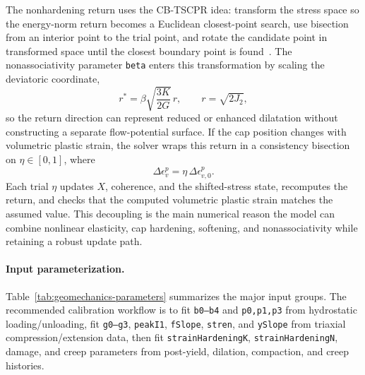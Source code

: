 The nonhardening return uses the CB-TSCPR idea: transform the stress space so the energy-norm return becomes a Euclidean closest-point search, use bisection from an interior point to the trial point, and rotate the candidate point in transformed space until the closest boundary point is found~\cite{homel2015cbtscpr}.  The nonassociativity parameter \texttt{beta} enters this transformation by scaling the deviatoric coordinate,
\begin{equation}
  r^* = \beta\sqrt{\frac{3K}{2G}}\,r,
  \qquad r=\sqrt{2J_2},
  \label{eq:geomechanics-transformed-space}
\end{equation}
so the return direction can represent reduced or enhanced dilatation without constructing a separate flow-potential surface.  If the cap position changes with volumetric plastic strain, the solver wraps this return in a consistency bisection on \(\eta\in[0,1]\), where
\begin{equation}
  \Delta\epsilon_v^p = \eta\,\Delta\epsilon_{v,0}^p.
  \label{eq:geomechanics-consistency-eta}
\end{equation}
Each trial \(\eta\) updates \(X\), coherence, and the shifted-stress state, recomputes the return, and checks that the computed volumetric plastic strain matches the assumed value.  This decoupling is the main numerical reason the model can combine nonlinear elasticity, cap hardening, softening, and nonassociativity while retaining a robust update path.

\paragraph{Input parameterization.}
Table~\ref{tab:geomechanics-parameters} summarizes the major input groups.  The recommended calibration workflow is to fit \texttt{b0--b4} and \texttt{p0,p1,p3} from hydrostatic loading/unloading, fit \texttt{g0--g3}, \texttt{peakI1}, \texttt{fSlope}, \texttt{stren}, and \texttt{ySlope} from triaxial compression/extension data, then fit \texttt{strainHardeningK}, \texttt{strainHardeningN}, damage, and creep parameters from post-yield, dilation, compaction, and creep histories.

